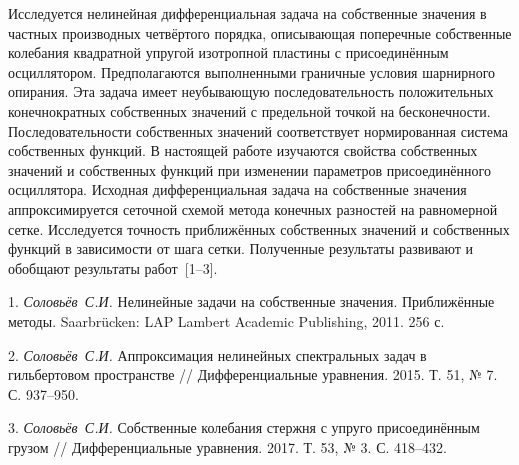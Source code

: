 \vzmscaption


Исследуется нелинейная дифференциальная задача на собственные значения в частных производных четвёртого порядка,
описывающая поперечные собственные колебания квадратной упругой изотропной пластины с присоединённым осциллятором.
Предполагаются выполненными граничные условия шарнирного опирания.
Эта задача имеет неубывающую последовательность положительных конечнократных собственных значений
с предельной точкой на бесконечности.
Последовательности собственных значений соответствует нормированная система
собственных функций.
В настоящей работе изучаются свойства собственных значений и собственных функций
при изменении параметров присоединённого осциллятора.
Исходная дифференциальная задача на собственные значения аппроксимируется
сеточной схемой метода конечных разностей на равномерной сетке.
Исследуется точность приближённых собственных значений
и собственных функций в зависимости от шага сетки.
Полученные результаты развивают и обобщают результаты работ~[1--3].



\litlist

1. {\it Соловьёв~С.И.}
Нелинейные задачи на собственные значения. Приближённые методы.
Saarbr\"ucken: LAP Lambert Academic Publishing, 2011. 256 с.

2. {\it Соловьёв~С.И.}
Аппроксимация нелинейных спектральных задач в гильбертовом пространстве
// Дифференциальные уравнения. 2015. Т. 51,
№ 7. С. 937--950.

3. {\it Соловьёв~С.И.}
Собственные колебания стержня с упруго присоединённым грузом
// Дифференциальные уравнения. 2017. Т. 53,
№ 3. С. 418--432.
